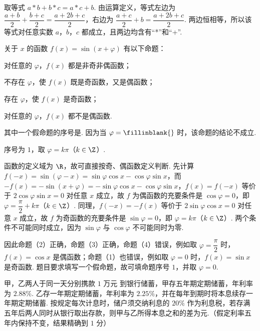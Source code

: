 \begin{solution}
取等式 \(a\ast b+b\ast c=a\ast c+b\). 由运算定义，等式左边为 \(\dfrac{a+b}{2}+\dfrac{b+c}{2}=\dfrac{a+2b+c}{2}\)，右边为 \(\dfrac{a+c}{2}+b=\dfrac{a+2b+c}{2}\). 两边恒相等，所以该等式对任意实数 \(a\)，\(b\)，\(c\) 都成立，且两边均含有“*”和“+”.
\end{solution}

\begin{problem}
关于 \(x\) 的函数 \(f(x)=\sin(x+\varphi)\) 有以下命题：

\begin{circlelist}
\item 对任意的 \(\varphi\)，\(f(x)\) 都是非奇非偶函数；
\item 不存在 \(\varphi\)，使 \(f(x)\) 既是奇函数，又是偶函数；
\item 存在 \(\varphi\)，使 \(f(x)\) 是奇函数；
\item 对任意的 \(\varphi\)，\(f(x)\) 都不是偶函数.
\end{circlelist}

其中一个假命题的序号是\fillinblank{}. 因为当 \(\varphi=\fillinblank{}\) 时，该命题的结论不成立.
\end{problem}

\begin{answer}
序号为 \(1\)，取 \(\varphi=k\pi\)（\(k\in\Z\)）.
\end{answer}

\begin{solution}
函数的定义域为 \(\R\)，故可直接按奇、偶函数定义判断. 先计算
\(f(-x)=\sin(\varphi-x)=\sin\varphi\cos x-\cos\varphi\sin x\)，而
\(-f(x)=-\sin(x+\varphi)=-\sin\varphi\cos x-\cos\varphi\sin x\)，\(f(x)=f(-x)\) 等价于 \(2\cos\varphi\sin x=0\) 对任意 \(x\) 成立，故 \(f\) 为偶函数的充要条件是 \(\cos\varphi=0\)，即 \(\varphi=\dfrac{\pi}{2}+k\pi\)（\(k\in\Z\)）. 同理，\(f(-x)=-f(x)\) 等价于 \(2\sin\varphi\cos x=0\) 对任意 \(x\) 成立，故 \(f\) 为奇函数的充要条件是 \(\sin\varphi=0\)，即 \(\varphi=k\pi\)（\(k\in\Z\)）. 两个条件不可能同时成立，因为 \(\sin\varphi\) 与 \(\cos\varphi\) 不可能同时为零.

因此命题（2）正确，命题（3）正确，命题（4）错误，例如取 \(\varphi=\dfrac{\pi}{2}\) 时，\(f(x)=\cos x\) 是偶函数；命题（1）也错误，例如取 \(\varphi=0\) 时，\(f(x)=\sin x\) 是奇函数. 题目要求填写一个假命题，故可填命题序号 \(1\)，并取 \(\varphi=0\).
\end{solution}

\begin{problem}
甲，乙两人于同一天分别携款 \(1\text{ 万元}\) 到银行储蓄，甲存五年期定期储蓄，年利率为 \(2.88\%\). 乙存一年期定期储蓄，年利率为 \(2.25\%\)，并在每年到期时将本息续存一年期定期储蓄. 按规定每次计息时，储户须交纳利息的 \(20\%\) 作为利息税，若存满五年后两人同时从银行取出存款，则甲与乙所得本息之和的差为\fillinblank{}元.（假定利率五年内保持不变，结果精确到 \(1\) 分）
\end{problem}

